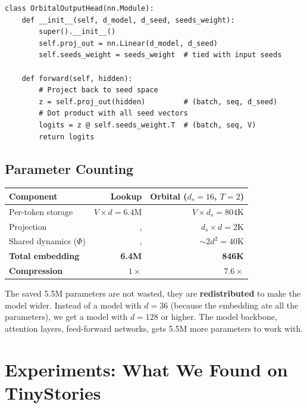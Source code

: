 \documentclass[11pt, a4paper]{article}
\theoremstyle{remark}
\begin{document}
\begin{lstlisting}[caption={Output head for orbital embeddings.}]
class OrbitalOutputHead(nn.Module):
    def __init__(self, d_model, d_seed, seeds_weight):
        super().__init__()
        self.proj_out = nn.Linear(d_model, d_seed)
        self.seeds_weight = seeds_weight  # tied with input seeds

    def forward(self, hidden):
        # Project back to seed space
        z = self.proj_out(hidden)         # (batch, seq, d_seed)
        # Dot product with all seed vectors
        logits = z @ self.seeds_weight.T  # (batch, seq, V)
        return logits
\end{lstlisting}

\subsection{Parameter Counting}

\begin{center}\small
\begin{tabular}{@{}p{4cm}rr@{}}
\toprule
\textbf{Component} & \textbf{Lookup} & \textbf{Orbital ($d_s{=}16$, $T{=}2$)} \\
\midrule
Per-token storage & $V \times d = 6.4$M & $V \times d_s = 804$K \\
Projection & ,  & $d_s \times d = 2$K \\
Shared dynamics ($\Phi$) & ,  & $\sim 2 d^2 = 40$K \\
\midrule
\textbf{Total embedding} & \textbf{6.4M} & \textbf{846K} \\
\textbf{Compression} & $1\times$ & $\mathbf{7.6\times}$ \\
\bottomrule
\end{tabular}
\end{center}

The saved 5.5M parameters are not wasted, they are \textbf{redistributed} to make the model wider.
Instead of a model with $d = 36$ (because the embedding ate all the parameters), we get a model with $d = 128$ or higher.
The model backbone, attention layers, feed-forward networks, gets 5.5M more parameters to work with.


\section{Experiments: What We Found on TinyStories}
\label{sec:experiments}
\end{document}
